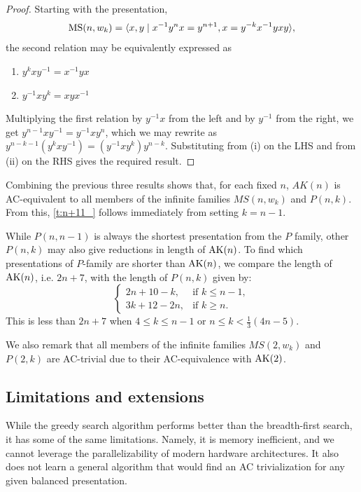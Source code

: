 \begin{proof}
    Starting with the presentation,
        \[
        \text{MS}(n, w_k) = \langle x, y \mid x^{-1} y^n x = y^{n+1}, x = y^{-k} x^{-1} y x y\rangle,
        \]
    the second relation may be equivalently expressed as 
    \begin{enumerate}[label=(\roman*)]
        \item $y^{k}xy^{-1}=x^{-1}yx$
        \item $y^{-1}xy^{k}=xyx^{-1}$
    \end{enumerate}
    Multiplying the first relation by $y^{-1} x$ from the left and by $y^{-1}$ from the right, we get $y^{n-1} x y^{-1} = y^{-1} x y^{n}$, which we may rewrite as $y^{n-k-1} \left(y^k x y^{-1}\right) = \left(y^{-1} x y^{k}\right) y^{n-k}$. Substituting from (i) on the LHS and from (ii) on the RHS gives the required result.
\end{proof}

Combining the previous three results shows that, for each fixed $n$, $AK(n)$ is AC-equivalent to all members of the infinite families $MS(n, w_k)$ and $P(n, k)$. From this, \autoref{t:n+11_} follows immediately from setting $k = n - 1$.

While $P(n, n-1)$ is always the shortest presentation from the $P$ family, other $P(n, k)$ may also give reductions in length of $\text{AK}(n)$. To find which presentations of $P$-family are shorter than $\text{AK}(n)$, we compare the length of $\text{AK}(n)$, i.e. $2n + 7$, with the length of $P(n, k)$ given by:
\[
    \begin{cases} 
        2n + 10 - k, & \text{if } k \leq n-1, \\
        3k + 12 - 2n, & \text{if } k \geq n.
    \end{cases}
\]
This is less than $2n+7$ when $4 \leq k \leq n-1$ or $n \leq k < \frac{1}{3} \left(4n-5 \right)$. 

We also remark that all members of the infinite families $MS(2, w_k)$ and $P(2, k)$ are AC-trivial due to their AC-equivalence with $\text{AK}(2)$.



\subsection{Limitations and extensions}

While the greedy search algorithm performs better than the breadth-first search, it has some of the same limitations.
Namely, it is memory inefficient, and we cannot leverage the parallelizability of modern hardware architectures.
It also does not learn a general algorithm that would find an AC trivialization for any given balanced presentation.

